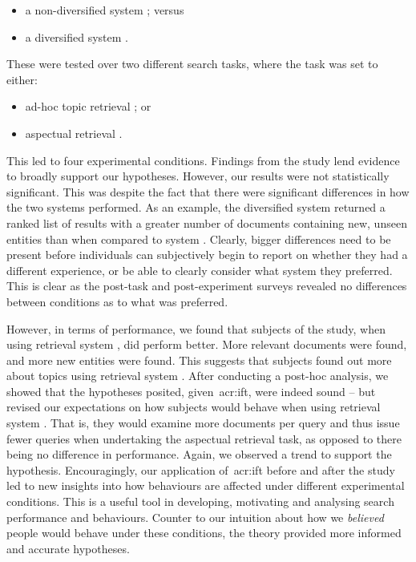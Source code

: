 \begin{itemize}
    \item{a non-diversified system ; versus}
    \item{a diversified system .}
\end{itemize}

These were tested over two different search tasks, where the task was set to either:

\begin{itemize}
    \item{ad-hoc topic retrieval ; or}
    \item{aspectual retrieval .}
\end{itemize}

This led to four experimental conditions. Findings from the study lend evidence to broadly support our hypotheses. However, our results were not statistically significant. This was despite the fact that there were significant differences in how the two systems performed. As an example, the diversified system  returned a ranked list of results with a greater number of documents containing new, unseen entities than when compared to system . Clearly, bigger differences need to be present before individuals can subjectively begin to report on whether they had a different experience, or be able to clearly consider what system they preferred. This is clear as the post-task and post-experiment surveys revealed no differences between conditions as to what was preferred.

However, in terms of performance, we found that subjects of the study, when using retrieval system , did perform better. More relevant documents were found, and more new entities were found. This suggests that subjects found out more about topics using retrieval system . After conducting a post-hoc analysis, we showed that the hypotheses posited, given~\gls{acr:ift}, were indeed sound -- but revised our expectations on how subjects would behave when using retrieval system . That is, they would examine more documents per query and thus issue fewer queries when undertaking the aspectual retrieval task, as opposed to there being no difference in performance. Again, we observed a trend to support the hypothesis. Encouragingly, our application of~\gls{acr:ift} before and after the study led to new insights into how behaviours are affected under different experimental conditions. This is a useful tool in developing, motivating and analysing search performance and behaviours. Counter to our intuition about how we \emph{believed} people would behave under these conditions, the theory provided more informed and accurate hypotheses.

